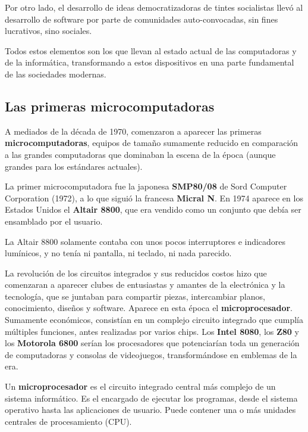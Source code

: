 Por otro lado, el desarrollo de ideas democratizadoras de tintes socialistas
llevó al desarrollo de software por parte de comunidades auto-convocadas, sin
fines lucrativos, sino sociales.

Todos estos elementos son los que llevan al estado actual de las computadoras y
de la informática, transformando a estos dispositivos en una parte fundamental
de las sociedades modernas.

\subsection{Las primeras microcomputadoras}
\label{chap:historia_computadoras:subsec:microcomputadoras}

A mediados de la década de 1970, comenzaron a aparecer las primeras
\textbf{microcomputadoras}, equipos de tamaño sumamente reducido en comparación
a las grandes computadoras que dominaban la escena de la época (aunque grandes
para los estándares actuales).

 La primer microcomputadora
fue la japonesa \textbf{SMP80/08} de Sord Computer Corporation (1972), a lo que
siguió la francesa \textbf{Micral N}. En 1974 aparece en los Estados Unidos el
\textbf{Altair 8800}, que era vendido como un conjunto que debía ser ensamblado
por el usuario.

\begin{knowwhat}
La Altair 8800 solamente contaba con unos pocos interruptores e indicadores
lumínicos, y no tenía ni pantalla, ni teclado, ni nada parecido.
\end{knowwhat}

 La revolución de los
circuitos integrados y sus reducidos costos hizo que comenzaran a aparecer
clubes de entusiastas y amantes de la electrónica y la tecnología, que se
juntaban para compartir piezas, intercambiar planos, conocimiento, diseños y
software. Aparece en esta época el \textbf{microprocesador}. Sumamente
económicos, consistían en un complejo circuito integrado que cumplía múltiples
funciones, antes realizadas por varios chips. Los \textbf{Intel 8080}, los
\textbf{Z80} y los \textbf{Motorola 6800} serían los procesadores que
potenciarían toda un generación de computadoras y consolas de videojuegos,
transformándose en emblemas de la era.\autocite[cap. 4-6]{ceruzzi_2003}

\begin{definition}
    Un \textbf{microprocesador} es el circuito integrado central más complejo de
    un sistema informático. Es el encargado de ejecutar los programas, desde el
    sistema operativo hasta las aplicaciones de usuario. Puede contener una o
    más unidades centrales de procesamiento (CPU).
\end{definition}

